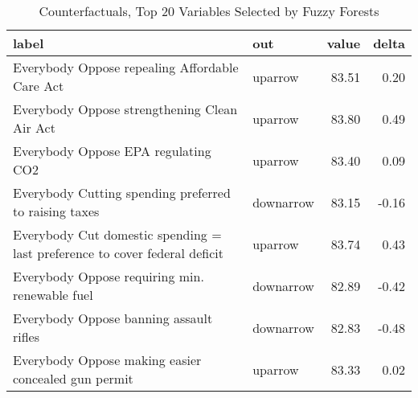 \begin{table}[hbt!]
\centering
\caption{Counterfactuals, Top 20 Variables Selected by Fuzzy Forests} 
\label{tab:counterfactual}
\begin{tabular}{llrr}
 label & out & value & delta \\ 
  \midrule
Everybody Oppose repealing Affordable Care Act & uparrow & 83.51 & 0.20 \\ 
  Everybody Oppose strengthening Clean Air Act & uparrow & 83.80 & 0.49 \\ 
  Everybody Oppose EPA regulating CO2 & uparrow & 83.40 & 0.09 \\ 
  Everybody Cutting spending preferred to raising taxes & downarrow & 83.15 & -0.16 \\ 
  Everybody Cut domestic spending = last preference to cover federal deficit & uparrow & 83.74 & 0.43 \\ 
  Everybody Oppose requiring min. renewable fuel & downarrow & 82.89 & -0.42 \\ 
  Everybody Oppose banning assault rifles & downarrow & 82.83 & -0.48 \\ 
  Everybody Oppose making easier concealed gun permit & uparrow & 83.33 & 0.02 \\ 
  \end{tabular}
\end{table}
